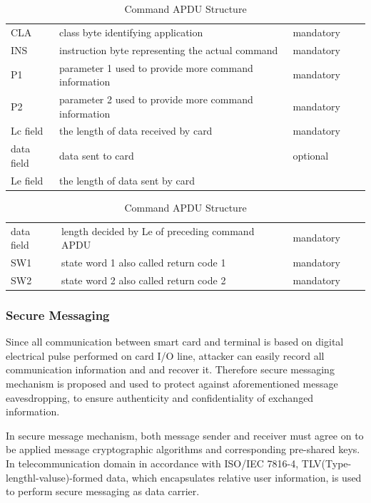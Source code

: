 \documentclass[]{llncs}
\begin{document}
\begin{table}[!htbp]
\caption{Command APDU Structure}
\centering
\begin{tabular}{lllll}
\hline\hline
 CLA &class byte identifying application  & mandatory \\[0.5ex]
 INS &instruction byte representing the actual command  & mandatory \\
 P1 &parameter 1 used to provide more command information & mandatory \\
 P2 &parameter 2 used to provide more command information& mandatory \\
 Lc field &the length of data received by card & mandatory \\
 data field &data sent to card& optional \\
Le field &the length of data sent by card \\
\hline
\end{tabular}
\label{table:capdu}
\end{table}

\begin{table}[ht]
\caption{Command APDU Structure}
\centering
\begin{tabular}{lllll}
\hline\hline
 data field & length decided by Le of preceding command  APDU  & mandatory \\[0.5ex]
 SW1 &state word 1 also called return code 1  & mandatory \\
 SW2 &state word 2 also called return code 2& mandatory \\
\hline
\end{tabular}
\label{table:rapdu}
\end{table}

\subsubsection{Secure Messaging}
Since all communication between smart card and terminal is based on digital electrical pulse performed on card I/O line, attacker can easily record all communication information and and recover it. Therefore secure messaging mechanism is proposed and used to protect against aforementioned message eavesdropping, to ensure authenticity and confidentiality of exchanged information.

In secure message mechanism, both message sender and receiver must agree on to be applied message cryptographic algorithms and corresponding pre-shared keys. In telecommunication domain in accordance with ISO/IEC 7816-4\cite{handbuch}, TLV(Type-lengthl-valuse)-formed data, which encapsulates relative user information, is used to perform secure messaging as data carrier.
\end{document}
